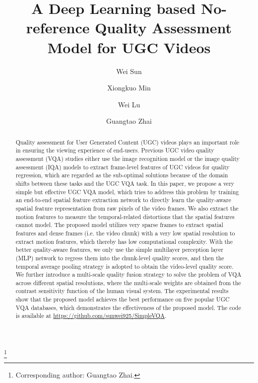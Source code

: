 \documentclass[sigconf]{acmart}
\begin{document}
\title{A Deep Learning based No-reference Quality Assessment Model for UGC Videos}



\author{Wei Sun}

\author{Xiongkuo Min}

\author{Wei Lu}


\author{Guangtao Zhai}






\thanks{Corresponding author: Guangtao Zhai.}















\begin{abstract}
Quality assessment for User Generated Content (UGC) videos plays an important role in ensuring the viewing experience of end-users. Previous UGC video quality assessment (VQA) studies either use the image recognition model or the image quality assessment (IQA) models to extract frame-level features of UGC videos for quality regression, which are regarded as the sub-optimal solutions because of the domain shifts between these tasks and the UGC VQA task. In this paper, we propose a very simple but effective UGC VQA model, which tries to address this problem by training an end-to-end spatial feature extraction network to directly learn the quality-aware spatial feature representation from raw pixels of the video frames. We also extract the motion features to measure the temporal-related distortions that the spatial features cannot model. The proposed model utilizes very sparse frames to extract spatial features and dense frames (i.e. the video chunk) with a very low spatial resolution to extract motion features, which thereby has low computational complexity. With the better quality-aware features, we only use the simple multilayer perception layer (MLP) network to regress them into the chunk-level quality scores, and then the temporal average pooling strategy is adopted to obtain the video-level quality score. We further introduce a multi-scale quality fusion strategy to solve the problem of VQA across different spatial resolutions, where the multi-scale weights are obtained from the contrast sensitivity function of the human visual system. The experimental results show that the proposed model achieves the best performance on five popular UGC VQA databases, which demonstrates the effectiveness of the proposed model. The code is available at \url{https://github.com/sunwei925/SimpleVQA}.
\end{abstract}
\end{document}
